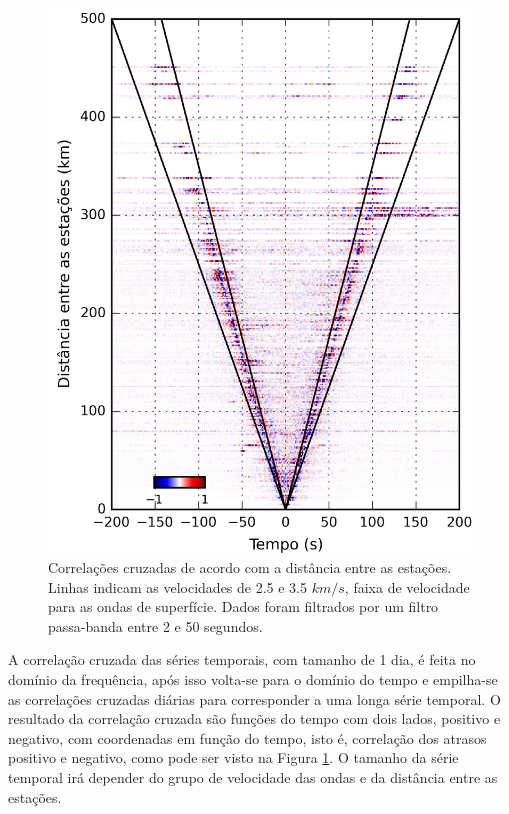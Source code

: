 \begin{figure}[!ht]
\centering
\includegraphics[scale=0.2]{Figs/correlaca_cruzada.png}
\caption[Correlações cruzadas de acordo com a distância entre as estações.]{Correlações cruzadas de acordo com a distância entre as estações. Linhas indicam as velocidades de 2.5 e 3.5 $km/s$, faixa de velocidade para as ondas de superfície. Dados foram filtrados por um filtro passa-banda entre 2 e 50 segundos.}
\label{correlacao_cruzada}
\end{figure} 

A correlação cruzada das séries temporais, com tamanho de 1 dia, é feita no domínio da frequência, após isso volta-se para o domínio do tempo e empilha-se as correlações cruzadas diárias para corresponder a uma longa série temporal. 
O resultado da correlação cruzada são funções do tempo com dois lados, positivo e negativo, com coordenadas em função do tempo, isto é, correlação dos atrasos positivo e negativo, como pode ser visto na Figura \ref{correlacao_cruzada}. O tamanho da série temporal irá depender do grupo de velocidade das ondas e da distância entre as estações.

